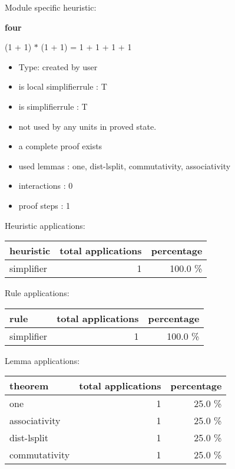 \documentclass[a4paper]{article}
\begin{document}
Module specific heuristic:

\pagebreak

{\LARGE\bf four}\label{lemma-four}

\medskip

 \Fol (1 + 1) $*$ (1 + 1) = 1 + 1 + 1 + 1

\begin{itemize}

\item Type: created by user

\item is local simplifierrule : T
\item is simplifierrule : T
\item not used by any units in proved state.
\item       a complete proof exists
\item       used lemmas  : one, dist-lsplit, commutativity, associativity
\item       interactions : 0
\item       proof steps  : 1
\end{itemize}

\medskip


Heuristic applications:

\begin{supertabular}{l|r|r}
heuristic	& total applications & percentage \\ \hline
simplifier & 1 & 100.0 \% \\

\end{supertabular}

Rule applications:

\begin{supertabular}{l|r|r}
rule	        & total applications & percentage \\ \hline
simplifier & 1 & 100.0 \% \\

\end{supertabular}

Lemma applications:

\begin{supertabular}{l|r|r}
theorem	        & total applications & percentage \\ \hline
one & 1 & 25.0 \% \\
associativity & 1 & 25.0 \% \\
dist-lsplit & 1 & 25.0 \% \\
commutativity & 1 & 25.0 \% \\

\end{supertabular}
\end{document}
